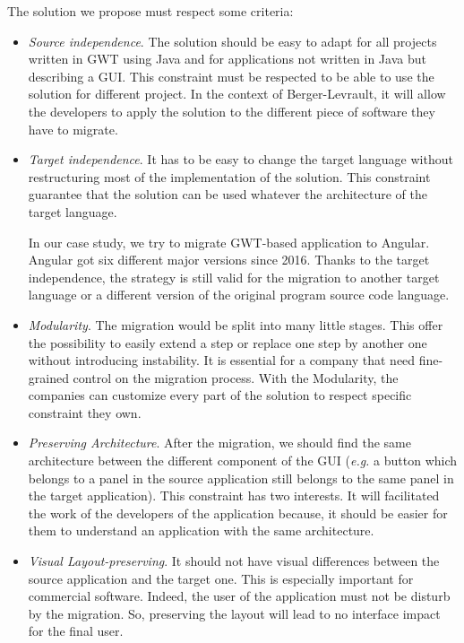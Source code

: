 \documentclass[conference]{IEEEtran}
\begin{document}
    The solution we propose must respect some criteria:
    \begin{itemize}
        \item \emph{Source independence}. The solution should be easy to adapt
            for all projects written in GWT using Java and for
            applications not written in Java but describing a GUI.
            This constraint must be respected to be able to use the solution
            for different project. In the context of Berger-Levrault, it will allow
            the developers to apply the solution to the different piece of software
            they have to migrate. 

        \item \emph{Target independence}. It has to be easy to change the target
            language without restructuring most of the implementation of the solution.
            This constraint guarantee that the solution can be used whatever the architecture
            of the target language. 
            
            In our case study, we try to migrate GWT-based application to Angular.
            Angular got six different major versions since 2016.
            Thanks to the target independence, the strategy is still valid for the migration
                to another target language or a different version of the original program source code language.

        \item \emph{Modularity}. The migration would be split into many little
            stages. This offer the possibility to easily extend a step or 
            replace one step by another one without introducing instability.
            It is essential for a company that need fine-grained control on the migration process.
            With the Modularity, the companies can customize every part of the solution
                to respect specific constraint they own.

        \item \emph{Preserving Architecture}. After the migration, we should find
            the same architecture between the different component of the GUI (\emph{e.g.}
            a button which belongs to a panel in the source application still belongs to the same panel in the target application).
            This constraint has two interests.
            It will facilitated the work of the developers of the application because,
                it should be easier for them to understand an application with the same architecture.

        \item \emph{Visual Layout-preserving}. It should not have visual differences
            between the source application and the target one.
            This is especially important for commercial software.
            Indeed, the user of the application must not be disturb by the migration.
            So, preserving the layout will lead to no interface impact for the final user. 
    \end{itemize}
    
\end{document}
